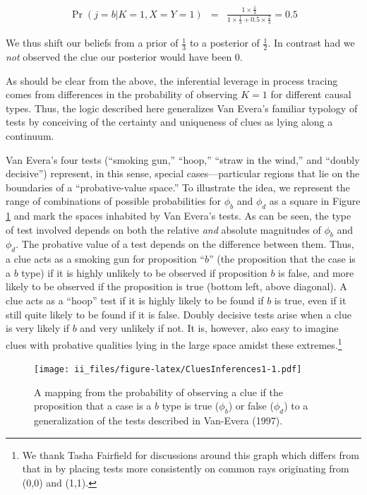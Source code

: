 \documentclass[
  12pt,
]{book}
\begin{document}
\begin{eqnarray*}
\Pr(j = b |K=1, X=Y=1)&=&\frac{1\times \frac13}{1 \times \frac13 + 0.5 \times \frac23}=0.5
\end{eqnarray*}

We thus shift our beliefs from a prior of \(\frac13\) to a posterior of \(\frac12\). In contrast had we \emph{not} observed the clue our posterior would have been 0.

As should be clear from the above, the inferential leverage in process tracing comes from differences in the probability of observing \(K=1\) for different causal types. Thus, the logic described here generalizes Van Evera's familiar typology of tests by conceiving of the certainty and uniqueness of clues as lying along a continuum.

Van Evera's four tests (``smoking gun,'' ``hoop,'' ``straw in the wind,'' and ``doubly decisive'') represent, in this sense, special cases---particular regions that lie on the boundaries of a ``probative-value space.'' To illustrate the idea, we represent the range of combinations of possible probabilities for \(\phi_b\) and \(\phi_d\) as a square in Figure \ref{fig:CluesInferences1} and mark the spaces inhabited by Van Evera's tests. As can be seen, the type of test involved depends on both the relative \emph{and} absolute magnitudes of \(\phi_b\) and \(\phi_d\). The probative value of a test depends on the difference between them. Thus, a clue acts as a smoking gun for proposition ``\(b\)'' (the proposition that the case is a \(b\) type) if it is highly unlikely to be observed if proposition \(b\) is false, and more likely to be observed if the proposition is true (bottom left, above diagonal). A clue acts as a ``hoop'' test if it is highly likely to be found if \(b\) is true, even if it still quite likely to be found if it is false. Doubly decisive tests arise when a clue is very likely if \(b\) and very unlikely if not. It is, however, also easy to imagine clues with probative qualities lying in the large space amidst these extremes.\footnote{We thank Tasha Fairfield for discussions around this graph which differs from that in \citet{humphreys2015mixing} by placing tests more consistently on common rays originating from (0,0) and (1,1).}

\begin{figure}
\centering
\texttt{[image: ii\_files/figure-latex/CluesInferences1-1.pdf]}
\caption{\label{fig:CluesInferences1}A mapping from the probability of observing a clue if the proposition that a case is a \(b\) type is true (\(\phi_b\)) or false (\(\phi_d\)) to a generalization of the tests described in Van-Evera (1997).}
\end{figure}
\end{document}
